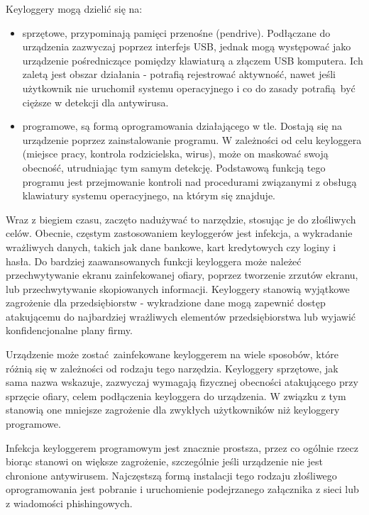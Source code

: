 \documentclass[12pt,twoside]{article}
\begin{document}
Keyloggery mogą dzielić się na:

\begin{itemize}
	\item sprzętowe, przypominają pamięci przenośne (pendrive). Podłączane do urządzenia zazwyczaj poprzez interfejs USB, jednak mogą występować jako urządzenie pośredniczące pomiędzy klawiaturą a złączem USB komputera. Ich zaletą jest obszar działania - potrafią rejestrować aktywność, nawet jeśli użytkownik nie uruchomił systemu operacyjnego i co do zasady potrafią być cięższe w detekcji dla antywirusa.
	\item programowe, są formą oprogramowania działającego w tle. Dostają się na urządzenie poprzez zainstalowanie programu. W zależności od celu keyloggera (miejsce pracy, kontrola rodzicielska, wirus), może on maskować swoją obecność, utrudniając tym samym detekcję. Podstawową funkcją tego programu jest przejmowanie kontroli nad procedurami związanymi z obsługą klawiatury systemu operacyjnego, na którym się znajduje.
\end{itemize}

Wraz z biegiem czasu, zaczęto nadużywać to narzędzie, stosując je do złośliwych celów. Obecnie, częstym zastosowaniem keyloggerów jest infekcja, a wykradanie wrażliwych danych, takich jak dane bankowe, kart kredytowych czy loginy i hasła. Do bardziej zaawansowanych funkcji keyloggera może należeć przechwytywanie ekranu zainfekowanej ofiary, poprzez tworzenie zrzutów ekranu, lub przechwytywanie skopiowanych informacji. Keyloggery stanowią wyjątkowe zagrożenie dla przedsiębiorstw - wykradzione dane mogą zapewnić dostęp atakującemu do najbardziej wrażliwych elementów przedsiębiorstwa lub wyjawić konfidencjonalne plany firmy.

Urządzenie może zostać zainfekowane keyloggerem na wiele sposobów, które różnią się w zależności od rodzaju tego narzędzia. Keyloggery sprzętowe, jak sama nazwa wskazuje, zazwyczaj wymagają fizycznej obecności atakującego przy sprzęcie ofiary, celem podłączenia keyloggera do urządzenia. W związku z tym stanowią one mniejsze zagrożenie dla zwykłych użytkowników niż keyloggery programowe.

Infekcja keyloggerem programowym jest znacznie prostsza, przez co ogólnie rzecz biorąc stanowi on większe zagrożenie, szczególnie jeśli urządzenie nie jest chronione antywirusem. Najczęstszą formą instalacji tego rodzaju złośliwego oprogramowania jest pobranie i uruchomienie podejrzanego załącznika z sieci lub z wiadomości phishingowych.
\end{document}
